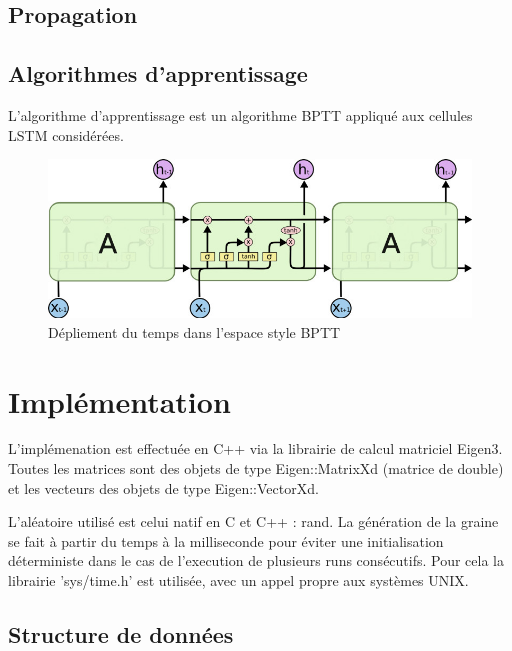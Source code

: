 \subsection{Propagation}

\subsection{Algorithmes d'apprentissage}
L'algorithme d'apprentissage est un algorithme BPTT appliqué aux cellules
LSTM considérées.

\begin{figure}[!ht]
\begin{center}
\includegraphics[scale=0.4]{images/lstm-bptt.png}
\end{center}
\caption{Dépliement du temps dans l'espace style BPTT}
\end{figure}

\section{Implémentation}

L'implémenation est effectuée en C++ via la librairie de calcul matriciel
Eigen3. Toutes les matrices sont des objets de type Eigen::MatrixXd (matrice de
double) et les vecteurs des objets de type Eigen::VectorXd.

\medskip

L'aléatoire utilisé est celui natif en C et C++ : rand.
La génération de la graine se fait à partir du temps à la milliseconde pour
éviter une initialisation déterministe dans le cas de l'execution de plusieurs
runs consécutifs. Pour cela la librairie 'sys/time.h' est utilisée, avec un
appel propre aux systèmes UNIX.

\bigskip

\subsection{Structure de données}

